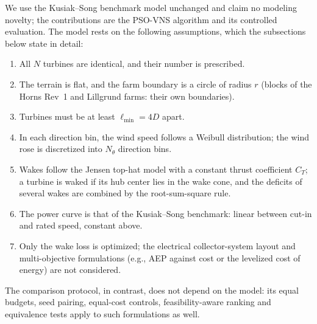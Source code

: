We use the Kusiak--Song benchmark model unchanged and claim no modeling novelty; the contributions are the PSO-VNS algorithm and its controlled evaluation. The model rests on the following assumptions, which the subsections below state in detail:
\begin{enumerate}
\item[A1.] All $N$ turbines are identical, and their number is prescribed.
\item[A2.] The terrain is flat, and the farm boundary is a circle of radius $r$ (blocks of the Horns Rev~1 and Lillgrund farms: their own boundaries).
\item[A3.] Turbines must be at least $\ell_{\min}=4D$ apart.
\item[A4.] In each direction bin, the wind speed follows a Weibull distribution; the wind rose is discretized into $N_\theta$ direction bins.
\item[A5.] Wakes follow the Jensen top-hat model with a constant thrust coefficient $C_T$; a turbine is waked if its hub center lies in the wake cone, and the deficits of several wakes are combined by the root-sum-square rule.
\item[A6.] The power curve is that of the Kusiak--Song benchmark: linear between cut-in and rated speed, constant above.
\item[A7.] Only the wake loss is optimized; the electrical collector-system layout and multi-objective formulations (e.g., AEP against cost or the levelized cost of energy) are not considered.
\end{enumerate}
The comparison protocol, in contrast, does not depend on the model: its equal budgets, seed pairing, equal-cost controls, feasibility-aware ranking and equivalence tests apply to such formulations as well.

